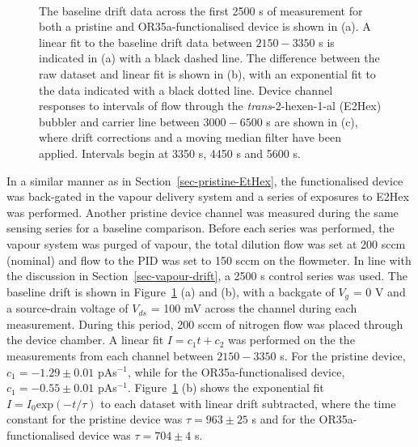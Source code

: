 \documentclass[
  a4paper,
]{scrbook}
\begin{document}
\begin{figure}
\begin{minipage}[t]{0.75\linewidth}
{{}

}

\end{minipage}%
%
\begin{minipage}[t]{0.10\linewidth}

{\centering 

~

}

\end{minipage}%

\caption{\label{fig-E2Hex-sampling}The baseline drift data across the
first 2500 s of measurement for both a pristine and OR35a-functionalised
device is shown in (a). A linear fit to the baseline drift data between
\(2150-3350\) s is indicated in (a) with a black dashed line. The
difference between the raw dataset and linear fit is shown in (b), with
an exponential fit to the data indicated with a black dotted line.
Device channel responses to intervals of flow through the
\emph{trans}-2-hexen-1-al (E2Hex) bubbler and carrier line between
\(3000-6500\) s are shown in (c), where drift corrections and a moving
median filter have been applied. Intervals begin at 3350 s, 4450 s and
5600 s.}

\end{figure}

In a similar manner as in Section~\ref{sec-pristine-EtHex}, the
functionalised device was back-gated in the vapour delivery system and a
series of exposures to E2Hex was performed. Another pristine device
channel was measured during the same sensing series for a baseline
comparison. Before each series was performed, the vapour system was
purged of vapour, the total dilution flow was set at 200 sccm (nominal)
and flow to the PID was set to 150 sccm on the flowmeter. In line with
the discussion in Section~\ref{sec-vapour-drift}, a 2500 s control
series was used. The baseline drift is shown in
Figure~\ref{fig-E2Hex-sampling} (a) and (b), with a backgate of \(V_g\)
= 0 V and a source-drain voltage of \(V_{ds}\) = 100 mV across the
channel during each measurement. During this period, 200 sccm of
nitrogen flow was placed through the device chamber. A linear fit
\(I = c_1t + c_2\) was performed on the the measurements from each
channel between \(2150-3350\) s. For the pristine device,
\(c_1 = -1.29\pm0.01\) pAs\(^{-1}\), while for the OR35a-functionalised
device, \(c_1 = -0.55\pm0.01\) pAs\(^{-1}\).
Figure~\ref{fig-E2Hex-sampling} (b) shows the exponential fit
\(I = I_0\textrm{exp}(-t/\tau)\) to each dataset with linear drift
subtracted, where the time constant for the pristine device was
\(\tau = 963 \pm 25\) s and for the OR35a-functionalised device was
\(\tau = 704 \pm 4\) s.
\end{document}
